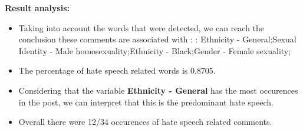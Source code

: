 \documentclass[11pt]{article}
\begin{document}
\textbf{\Large Result analysis:}

\begin{itemize}\item Taking into account the words that were detected, we can reach the conclusion these comments are associated with : : Ethnicity - General;Sexual Identity - Male homosexuality;Ethnicity - Black;Gender - Female sexuality;%

\item The percentage of hate speech related words is 0.8705.

\item Considering that the variable \textbf{Ethnicity - General} has the most occurences in the post, we can interpret that this is the predominant hate speech.

\item Overall there were 12/34 occurences of hate speech related comments.\end{itemize}
\end{document}

